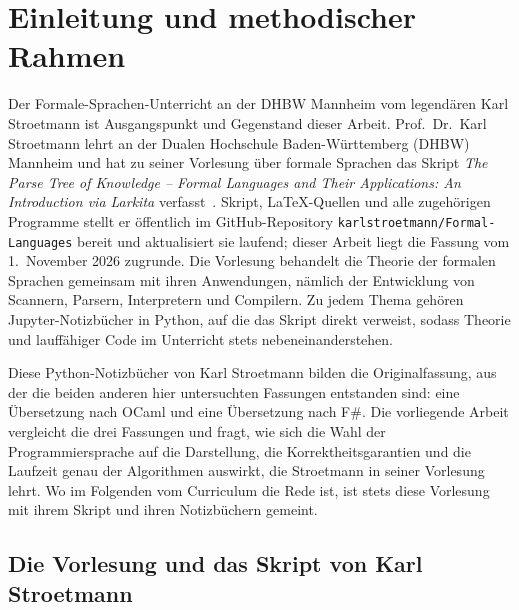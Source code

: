 \chapter{Einleitung und methodischer Rahmen}
\label{chap:introduction}

Der Formale-Sprachen-Unterricht an der DHBW Mannheim vom legendären Karl Stroetmann ist Ausgangspunkt und Gegenstand dieser Arbeit.
Prof.~Dr.~Karl Stroetmann lehrt an der Dualen Hochschule Baden-Württemberg (DHBW) Mannheim und hat zu seiner Vorlesung über formale Sprachen das Skript \emph{The Parse Tree of Knowledge -- Formal Languages and Their Applications: An Introduction via Larkita} verfasst~\cite{stroetmann2026formal}.
Skript, \LaTeX{}-Quellen und alle zugehörigen Programme stellt er öffentlich im GitHub-Repository \texttt{karlstroetmann/Formal-Languages} bereit und aktualisiert sie laufend; dieser Arbeit liegt die Fassung vom 1.~November 2026 zugrunde.
Die Vorlesung behandelt die Theorie der formalen Sprachen gemeinsam mit ihren Anwendungen, nämlich der Entwicklung von Scannern, Parsern, Interpretern und Compilern.
Zu jedem Thema gehören Jupyter-Notizbücher in Python, auf die das Skript direkt verweist, sodass Theorie und lauffähiger Code im Unterricht stets nebeneinanderstehen.

Diese Python-Notizbücher von Karl Stroetmann bilden die Originalfassung, aus der die beiden anderen hier untersuchten Fassungen entstanden sind: eine Übersetzung nach OCaml und eine Übersetzung nach F\#.
Die vorliegende Arbeit vergleicht die drei Fassungen und fragt, wie sich die Wahl der Programmiersprache auf die Darstellung, die Korrektheitsgarantien und die Laufzeit genau der Algorithmen auswirkt, die Stroetmann in seiner Vorlesung lehrt.
Wo im Folgenden vom \glqq Curriculum\grqq{} die Rede ist, ist stets diese Vorlesung mit ihrem Skript und ihren Notizbüchern gemeint.

\section{Die Vorlesung und das Skript von Karl Stroetmann}
\label{sec:intro_domain}

